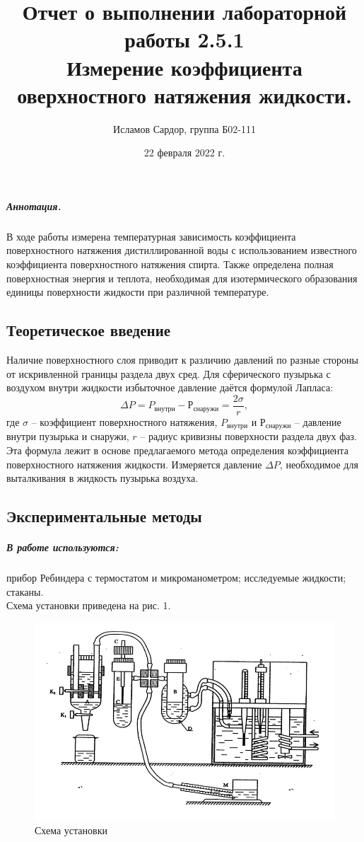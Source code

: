 \documentclass[12pt,a4paper]{article}
\title{
Отчет о выполнении лабораторной работы 2.5.1 \\
Измерение коэффициента оверхностного натяжения жидкости.}
\author{Исламов Сардор, группа Б02-111}
\date{22 февраля 2022 г. }
\begin{document}
\maketitle

\subparagraph*{Аннотация.} В ходе работы измерена температурная зависимость коэффициента поверхностного натяжения дистиллированной воды с использованием известного коэффициента поверхностного натяжения спирта. Также определена полная поверхностная энергия и теплота, необходимая для изотермического образования единицы  поверхности жидкости при различной температуре. 

\subsection*{Теоретическое введение} 
Наличие поверхностного слоя приводит к различию давлений по разные стороны от искривленной границы раздела двух сред.  Для сферического пузырька с воздухом  внутри жидкости избыточное давление даётся формулой Лапласа:
\begin{equation}
    \Delta P = P_{внутри} - Р_{снаружи} = \frac {2 \sigma} r,
\end{equation}
где $\sigma$ – коэффициент поверхностного натяжения, $P_{внутри}$ и $Р_{снаружи}$ – давление внутри пузырька и снаружи, $r$ – радиус кривизны поверхности раздела двух фаз. Эта формула лежит в основе предлагаемого метода определения коэффициента поверхностного натяжения жидкости. Измеряется давление $\Delta P$, необходимое для выталкивания в жидкость пузырька воздуха.

\subsection*{Экспериментальные методы}
\subparagraph*{В работе используются:}прибор  Ребиндера  с термостатом и микроманометром; исследуемые жидкости; стаканы.
\\

Схема установки приведена на рис. 1.
\\

\begin{figure}[ht]
    \centering
    \includegraphics[width=0.7\linewidth]{image.jpeg}
    \caption{Схема установки}
    \label{fig:my_label}
\end{figure}
\end{document}

